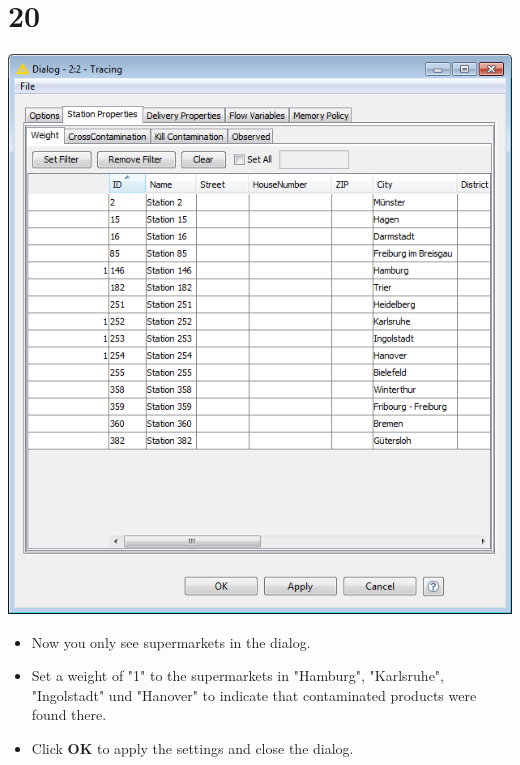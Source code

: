 \documentclass[10pt]{beamer}
\begin{document}
\section{20}
\begin{frame}
	\begin{center}
  		\includegraphics[height=0.6\textheight]{20.png}
	\end{center}
	\begin{itemize}
		\item Now you only see supermarkets in the dialog.
		\item Set a weight of "1" to the supermarkets in "Hamburg", "Karlsruhe", "Ingolstadt" und "Hanover" to indicate that contaminated products were found there.
		\item Click \textbf{OK} to apply the settings and close the dialog.
	\end{itemize}
\end{frame}
\end{document}

